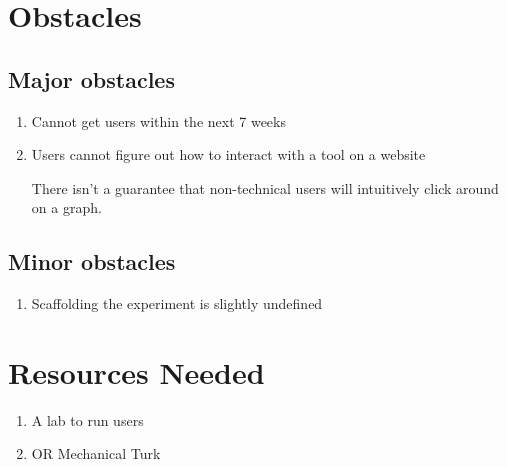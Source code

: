 \documentclass{proc}
\begin{document}
\section{Obstacles}

\subsection{Major obstacles} %

\begin{enumerate}
    \item Cannot get users within the next 7 weeks
    \item Users cannot figure out how to interact with a tool on a website

    There isn't a guarantee that non-technical users will intuitively click around on a graph. 

\end{enumerate}

\subsection{Minor obstacles}

\begin{enumerate}
    \item Scaffolding the experiment is slightly undefined
\end{enumerate}

\section{Resources Needed}
\begin{enumerate}
    \item A lab to run users
    \item OR Mechanical Turk
\end{enumerate}
\end{document}
